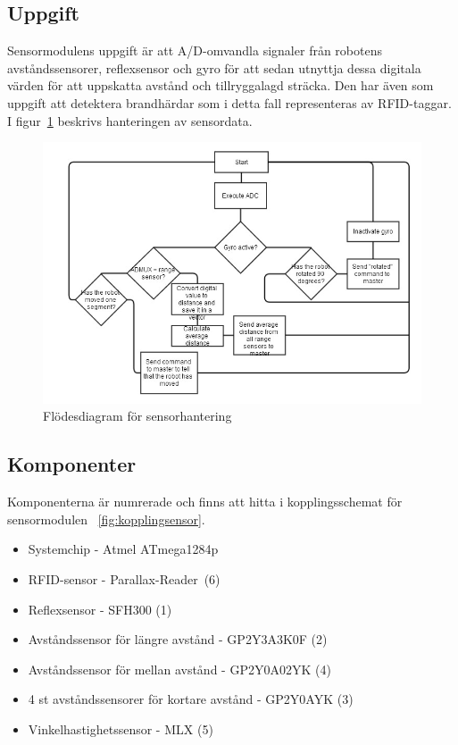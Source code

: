 \documentclass[a4paper,12pt,fleqn]{article}
\begin{document}
\subsection{Uppgift}
Sensormodulens uppgift är att A/D-omvandla signaler från robotens avståndssensorer, reflexsensor och gyro för att sedan utnyttja dessa digitala värden för att uppskatta avstånd och tillryggalagd sträcka. Den har även som uppgift att detektera brandhärdar som i detta fall representeras av RFID-taggar. I figur~\ref{fig:sensorflow} beskrivs hanteringen av sensordata.

\begin{figure}[htp] %
  \begin{center}
  \includegraphics[keepaspectratio=true,width=0.6\linewidth]{bilder/sensorflode}  %
  \end{center}
  \caption{Flödesdiagram för sensorhantering} %
  \label{fig:sensorflow}
\end{figure}

\subsection{Komponenter}
Komponenterna är numrerade och finns att hitta i kopplingsschemat för sensormodulen ~\ref{fig:kopplingsensor}.
\begin{itemize}
	\item Systemchip - Atmel ATmega1284p
	\item RFID-sensor - Par\-all\-ax-Read\-er\ (6)
	\item Reflexsensor - SFH300 (1)
	\item Avståndssensor för längre avstånd - GP\-2Y3A\-3K\-0F (2)
	\item Avståndssensor för mellan avstånd - GP2Y0A02YK (4)
	\item 4 st avståndssensorer för kortare avstånd - GP\-2Y\-0A\-YK (3)
	\item Vinkelhastighetssensor - MLX (5)
\end{itemize}
~\\
\end{document}

